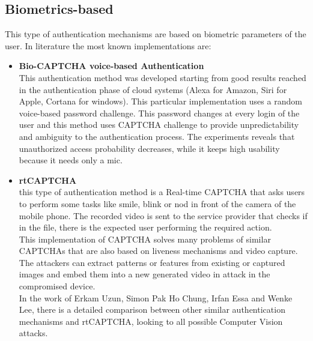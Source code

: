 \subsection{Biometrics-based}
This type of authentication mechanisms are based on biometric parameters of the user. In literature the most known implementations are:
\begin{itemize}
\item{\textbf{Bio-CAPTCHA voice-based Authentication}\\
This authentication method was developed starting from good results reached in the authentication phase of cloud systems (Alexa for Amazon, Siri for Apple, Cortana for windows)\cite{voice_CAPTCHA}. This particular implementation uses a random voice-based password challenge. This password changes at every login of the user and this method uses CAPTCHA challenge to provide unpredictability and ambiguity to the authentication process. The experiments reveals that unauthorized access probability decreases, while it keeps high usability because it needs
only a mic.
}
\item{\textbf{rtCAPTCHA}\\
this type of authentication method is a Real-time CAPTCHA that asks users to perform some tasks like smile, blink or nod in front of the camera of the mobile phone. The recorded video is sent to the service provider that checks if in the file, there is the expected user performing the required action.\\
This implementation of CAPTCHA solves many problems of similar CAPTCHAs that are also based on liveness mechanisms and video capture. The attackers can extract patterns or features from existing or captured images and embed them into a new generated video in attack in the compromised device.\\
In the work of Erkam Uzun, Simon Pak Ho Chung, Irfan Essa and Wenke Lee\cite{rtCAPTCHA}, there is a detailed comparison between other similar authentication mechanisms and rtCAPTCHA, looking to all possible Computer Vision attacks.
}
\end{itemize}

